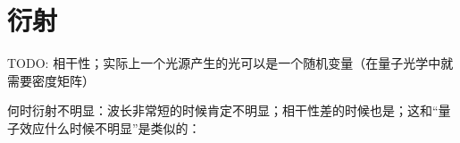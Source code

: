 \section{衍射}

TODO: 相干性；实际上一个光源产生的光可以是一个随机变量（在量子光学中就需要密度矩阵）

何时衍射不明显：波长非常短的时候肯定不明显；相干性差的时候也是；这和“量子效应什么时候不明显”是类似的：